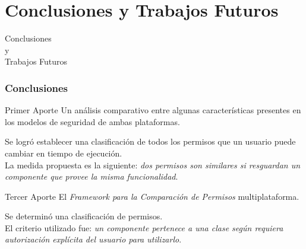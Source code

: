 \section{Conclusiones y Trabajos Futuros}
\begin{frame}
 \begin{center}
  \LARGE Conclusiones\\ y\\ Trabajos Futuros
 \end{center}
\end{frame}
\begin{frame}
 \frametitle{Conclusiones}
 \begin{footnotesize}
 \begin{exampleblock}{Primer Aporte}
Un análisis comparativo entre algunas características presentes en los modelos de seguridad de ambas plataformas.
 \end{exampleblock}\pause
 \begin{exampleblock}{}
Se logró establecer una clasificación de todos los permisos que un usuario puede cambiar en tiempo de ejecución.\\ \pause La medida propuesta es la siguiente: \emph{dos permisos son similares si resguardan un componente que provee la misma funcionalidad}.\\ 
 \end{exampleblock}\pause
 \begin{exampleblock}{Tercer Aporte}
El \emph{Framework para la Comparación de Permisos} multiplataforma.
 \end{exampleblock} \pause
 \begin{exampleblock}{}
Se determinó una clasificación de permisos.\\ \pause El criterio utilizado fue: \emph{un componente pertenece a una clase según requiera autorización explícita del usuario para utilizarlo}.
 \end{exampleblock}
 \end{footnotesize}
\end{frame}
